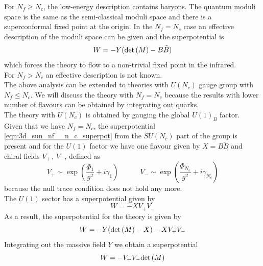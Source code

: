 For $N_f \geq N_c $, the low-energy description contains baryons.
The quantum moduli space is the same as the semi-classical moduli space and there is a superconformal fixed point at the origin.
In the $N_f = N_c$ case an effective description of the moduli space can be given and the superpotential is \cite{Aharony:1997bx}
\begin{equation}
W = - Y ( \mathrm{det } \,{(M)} - B \tilde{B})
\label{eqn:3d_sun_nf__n_c_superpot}
\end{equation}
which forces the theory to flow to a non-trivial fixed point in the infrared.\\
For $N_f >N_c$ an effective description is not known.
\\
The above analysis can be extended to theories with $U(N_c)$ gauge group with $N_f \leq N_c$.
We will discuss the theory with $N_f = N_c$ because the results with lower number of flavours can be obtained by integrating out quarks.\\
The theory with $U(N_c)$ is obtained by gauging the global $U(1)_B$ factor.\\
Given that we have $N_f=N_c$, the superpotential \eqref{eqn:3d_sun_nf__n_c_superpot} from the $SU(N_c)$ part of the group is present and for the $U(1)$ factor we have one flavour given by $X = B \tilde{B}$ 
and chiral fields $V_+ \, , \,V_-$, defined as 
\begin{equation}
V_+ \sim \exp{ \left(  \frac{\Phi_1}{g^2} + i \gamma_1 \right) } \qquad \quad V_- \sim \exp{ \left( \frac{\Phi_{N_c}}{g^2} + i \gamma_{N_c} \right) }
\label{eqn:un_moduli_space_coordinates}
\end{equation}
because the null trace condition does not hold any more.\\
 The $U(1)$ sector has a superpotential given by
 $$ W = - X V_+ V_-$$
As a result, the superpotential for the theory is given by
\begin{equation}
 W = - Y ( \mathrm{det } \,{(M)}  - X) - X V_+ V_- 
 \end{equation} 
Integrating out the massive field $Y$  we obtain a superpotential
\begin{equation}
W = -  V_+ V_-  \mathrm{det } \,{(M)}
\label{eqn:aharony_dual_description_NcNf}
\end{equation}


















